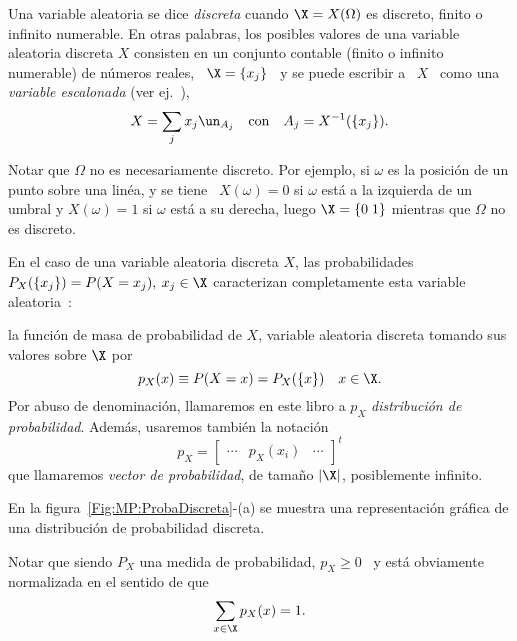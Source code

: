 \begin{definicion}
\label{Def:MP:VariableAleatoriaDiscreta}
%
Una  variable  aleatoria se  dice  {\it discreta}  cuando  $\X  = X(\Omega)$  es
discreto, finito o  infinito numerable. En otras palabras,  los posibles valores
de una variable aleatoria discreta $X$ consisten en un conjunto contable (finito
o infinito  numerable) de  n\'umeros reales, \  $\X =  \{ x_j \}$  \ y  se puede
escribir a \  $X$ \ como una {\it  variable escalonada} (ver ej.~\cite{AthLah06,
  HogMck13}),
  \[
  X = \sum_j x_j \un_{A_j} \quad \mbox{con} \quad A_j = X^{-1}(\{ x_j \}).
  \]
\end{definicion}
%
\noindent Notar  que $\Omega$  no es necesariamente  discreto.  Por  ejemplo, si
$\omega$ es la posici\'on de un punto sobre una lin\'ea, y se tiene \ $X(\omega)
=  0$ si  $\omega$ est\'a  a la  izquierda de  un umbral  y $X(\omega)  =  1$ si
$\omega$ est\'a a su derecha, luego $\X = \{ 0 \; 1 \}$ mientras que $\Omega$ no
es discreto.

En el  caso de una variable  aleatoria discreta $X$,  las probabilidades $P_X(\{
x_j \})  = P(X = x_j), \:  x_j \in \X$ caracterizan  completamente esta variable
aleatoria~\cite{AshDol99, AthLah06, HogMck13}:
%
\begin{definicion}
\label{Def:MP:MasaProbabilidad}
%
   la  funci\'on  de  masa de  probabilidad  de $X$,  variable
  aleatoria discreta tomando sus valores sobre $\X$ por
  \[
  p_X(x) \equiv P(X = x) = P_X( \{ x\} ) \quad x \in \X.
  \]
  Por   abuso  de   denominaci\'on,  llamaremos   en  este   libro a   $p_X$  {\it
    distribuci\'on de probabilidad}. Adem\'as, usaremos tambi\'en la notaci\'on
  \[
  p_X = \begin{bmatrix} \cdots & p_X(x_i) & \cdots \end{bmatrix}^t
  \]
  que llamaremos {\it vector  de probabilidad}, de tama\~no $|\X|$, posiblemente
  infinito.
\end{definicion}
%
En  la  figura~\ref{Fig:MP:ProbaDiscreta}-(a)  se muestra  una  representaci\'on
gr\'afica de una distribuci\'on de probabilidad discreta.

Notar  que siendo  $P_X$ una  medida de  probabilidad, $p_X  \ge 0$  \  y est\'a
obviamente normalizada en el sentido de que
%
\[
\sum_{x \in \X} p_X(x) = 1.
\]
%

